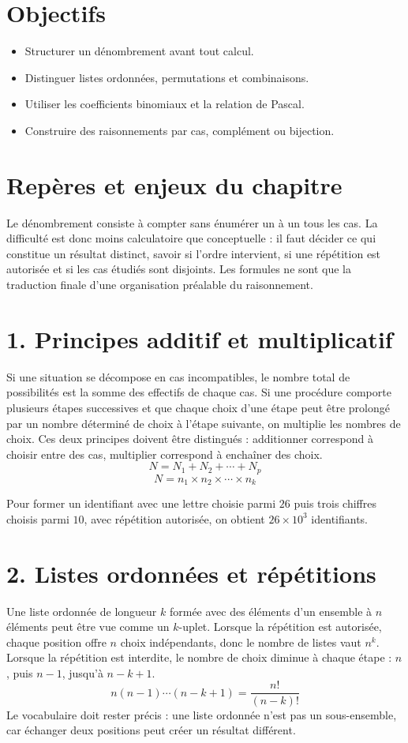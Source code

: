 
\section{Objectifs}
\begin{itemize}
\item Structurer un dénombrement avant tout calcul.
\item Distinguer listes ordonnées, permutations et combinaisons.
\item Utiliser les coefficients binomiaux et la relation de Pascal.
\item Construire des raisonnements par cas, complément ou bijection.
\end{itemize}

\section{Repères et enjeux du chapitre}
Le dénombrement consiste à compter sans énumérer un à un tous les cas. La difficulté est donc moins calculatoire que conceptuelle : il faut décider ce qui constitue un résultat distinct, savoir si l'ordre intervient, si une répétition est autorisée et si les cas étudiés sont disjoints. Les formules ne sont que la traduction finale d'une organisation préalable du raisonnement.

\section{1. Principes additif et multiplicatif}
Si une situation se décompose en cas incompatibles, le nombre total de possibilités est la somme des effectifs de chaque cas. Si une procédure comporte plusieurs étapes successives et que chaque choix d'une étape peut être prolongé par un nombre déterminé de choix à l'étape suivante, on multiplie les nombres de choix. Ces deux principes doivent être distingués : additionner correspond à choisir entre des cas, multiplier correspond à enchaîner des choix.
\[
N=N_1+N_2+\cdots+N_p
\]
\[
N=n_1\times n_2\times\cdots\times n_k
\]
\begin{exemple}
Pour former un identifiant avec une lettre choisie parmi $26$ puis trois chiffres choisis parmi $10$, avec répétition autorisée, on obtient $26\times10^3$ identifiants.
\end{exemple}

\section{2. Listes ordonnées et répétitions}
Une liste ordonnée de longueur $k$ formée avec des éléments d'un ensemble à $n$ éléments peut être vue comme un $k$-uplet. Lorsque la répétition est autorisée, chaque position offre $n$ choix indépendants, donc le nombre de listes vaut $n^k$. Lorsque la répétition est interdite, le nombre de choix diminue à chaque étape : $n$, puis $n-1$, jusqu'à $n-k+1$.
\[
n(n-1)\cdots(n-k+1)=\frac{n!}{(n-k)!}
\]
Le vocabulaire doit rester précis : une liste ordonnée n'est pas un sous-ensemble, car échanger deux positions peut créer un résultat différent.

